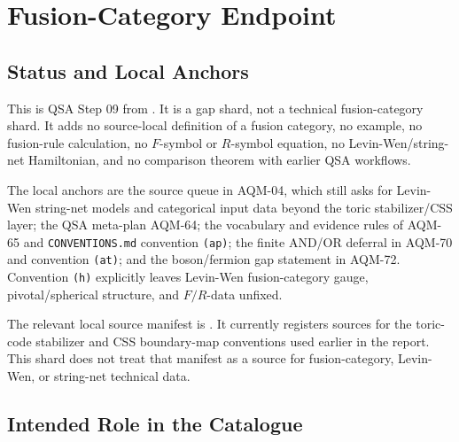 
\section{Fusion-Category Endpoint}
\label{sec:qsa-fusion-category-endpoint}

\subsection{Status and Local Anchors}

This is QSA Step 09 from
.  It is a gap shard, not a
technical fusion-category shard.  It adds no source-local definition of a
fusion category, no example, no fusion-rule calculation, no \(F\)-symbol or
\(R\)-symbol equation, no Levin-Wen/string-net Hamiltonian, and no
comparison theorem with earlier QSA workflows.

The local anchors are the source queue in AQM-04, which still asks for
Levin-Wen string-net models and categorical input data beyond the toric
stabilizer/CSS layer; the QSA meta-plan AQM-64; the vocabulary and evidence
rules of AQM-65 and \texttt{CONVENTIONS.md} convention \texttt{(ap)}; the
finite AND/OR deferral in AQM-70 and convention \texttt{(at)}; and the
boson/fermion gap statement in AQM-72.  Convention \texttt{(h)} explicitly
leaves Levin-Wen fusion-category gauge, pivotal/spherical structure, and
\(F/R\)-data unfixed.

The relevant local source manifest is
.  It currently registers sources for
the toric-code stabilizer and CSS boundary-map conventions used earlier in
the report.  This shard does not treat that manifest as a source for
fusion-category, Levin-Wen, or string-net technical data.

\subsection{Intended Role in the Catalogue}

